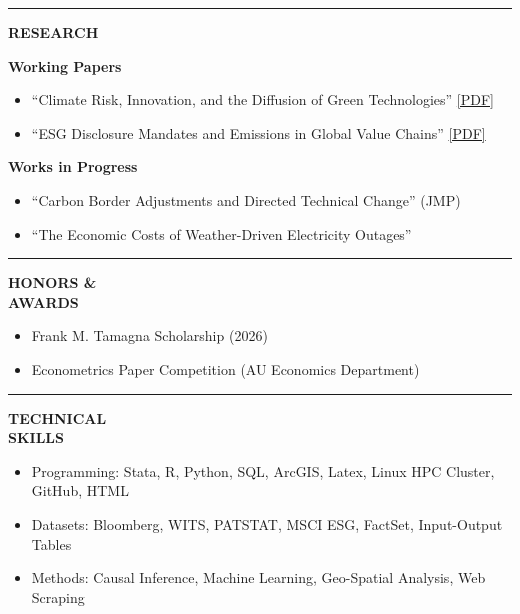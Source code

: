 \documentclass[11pt,letterpaper]{article}
\newcommand{\sectionlabel}[1]{%
  {\centering\bfseries\MakeUppercase{#1}\par}
}
\newcommand{\sectionrule}{\vspace{0.4em}\noindent\rule{\textwidth}{0.5pt}\vspace{0.4em}}
\newcommand{\resrow}[2]{%
  \noindent
  \begin{minipage}[t]{1.06in}
    \sectionlabel{#1}
  \end{minipage}%
  \hspace{0.16in}%
  \begin{minipage}[t]{5.88in}
    \justifying #2
  \end{minipage}\par
}
\begin{document}
\sectionrule

\resrow{Research}{%
\noindent\textbf{Working Papers}\par
\begin{itemize}
    \item ``Climate Risk, Innovation, and the Diffusion of Green Technologies'' \href{https://papers.ssrn.com/sol3/papers.cfm?abstract_id=6516621}{[PDF]}
    \item ``ESG Disclosure Mandates and Emissions in Global Value Chains'' \href{https://niconastri.com/files/ESG_Disclosure_Supply_Chains.pdf}{[PDF]}
\end{itemize}
\vspace{0.4em}
\noindent\textbf{Works in Progress}\par
\begin{itemize}
    \item ``Carbon Border Adjustments and Directed Technical Change'' (JMP)
    \item ``The Economic Costs of Weather-Driven Electricity Outages''
\end{itemize}}

\sectionrule

\resrow{Honors \&\\Awards}{%
\begin{itemize}
    \item Frank M. Tamagna Scholarship (2026)
    \item Econometrics Paper Competition (AU Economics Department)
\end{itemize}}

\sectionrule

\resrow{Technical\\Skills}{%
\begin{itemize}
    \item Programming: Stata, R, Python, SQL, ArcGIS, Latex, Linux HPC Cluster, GitHub, HTML
    \item Datasets: Bloomberg, WITS, PATSTAT, MSCI ESG, FactSet, Input-Output Tables
    \item Methods: Causal Inference, Machine Learning, Geo-Spatial Analysis, Web Scraping
\end{itemize}}
\end{document}

